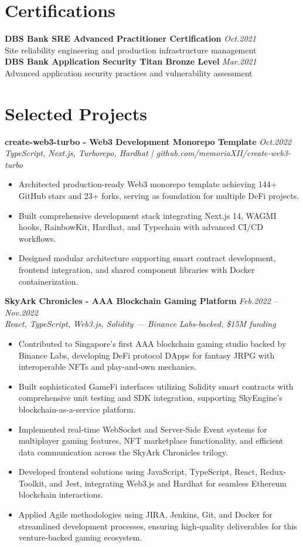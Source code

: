 \documentclass[11pt,a4paper]{article}
\newcommand{\resumeItem}[1]{\item\small{#1}}
\begin{document}
\vspace{10pt}

\section{Certifications}
\textbf{DBS Bank SRE Advanced Practitioner Certification} \hfill \textit{Oct.2021}\\
Site reliability engineering and production infrastructure management\\
\textbf{DBS Bank Application Security Titan Bronze Level} \hfill \textit{Mar.2021}\\
Advanced application security practices and vulnerability assessment\\

\vspace{0pt}

\section{Selected Projects}
\textbf{create-web3-turbo - Web3 Development Monorepo Template} \hfill \textit{Oct.2022}\\
\textit{TypeScript, Next.js, Turborepo, Hardhat | github.com/memoriaXII/create-web3-turbo}
\begin{itemize}[leftmargin=*, itemsep=1pt, parsep=0pt]
    \resumeItem{Architected production-ready Web3 monorepo template achieving 144+ GitHub stars and 23+ forks, serving as foundation for multiple DeFi projects.}
    \resumeItem{Built comprehensive development stack integrating Next.js 14, WAGMI hooks, RainbowKit, Hardhat, and Typechain with advanced CI/CD workflows.}
    \resumeItem{Designed modular architecture supporting smart contract development, frontend integration, and shared component libraries with Docker containerization.}
\end{itemize}
\textbf{SkyArk Chronicles - AAA Blockchain Gaming Platform} \hfill \textit{Feb.2022 -- Nov.2022}\\
\textit{React, TypeScript, Web3.js, Solidity — Binance Labs-backed, \$15M funding}
\begin{itemize}[leftmargin=*, itemsep=1pt, parsep=0pt]
    \resumeItem{Contributed to Singapore's first AAA blockchain gaming studio backed by Binance Labs, developing DeFi protocol DApps for fantasy JRPG with interoperable NFTs and play-and-own mechanics.}
    \resumeItem{Built sophisticated GameFi interfaces utilizing Solidity smart contracts with comprehensive unit testing and SDK integration, supporting SkyEngine's blockchain-as-a-service platform.}
    \resumeItem{Implemented real-time WebSocket and Server-Side Event systems for multiplayer gaming features, NFT marketplace functionality, and efficient data communication across the SkyArk Chronicles trilogy.}
    \resumeItem{Developed frontend solutions using JavaScript, TypeScript, React, Redux-Toolkit, and Jest, integrating Web3.js and Hardhat for seamless Ethereum blockchain interactions.}
    \resumeItem{Applied Agile methodologies using JIRA, Jenkins, Git, and Docker for streamlined development processes, ensuring high-quality deliverables for this venture-backed gaming ecosystem.}
\end{itemize}
\end{document}
